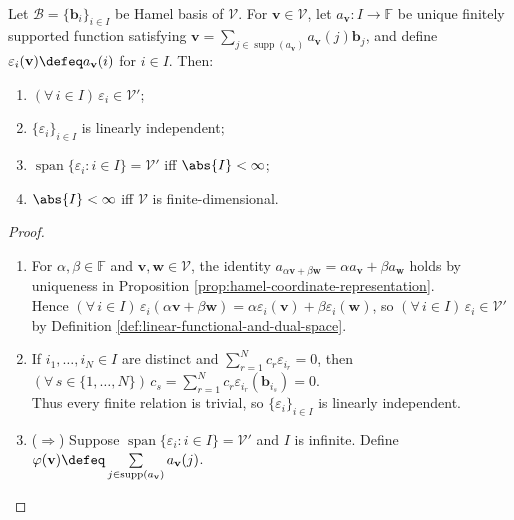 \begin{proposition} \label{prop:coordinate-functionals-for-hamel-basis} \\
Let $\mathcal{B}=\{\mathbf{b}_i\}_{i\in I}$ be Hamel basis of $\mathcal{V}$. For $\mathbf{v}\in\mathcal{V}$, let $a_{\mathbf{v}}:I\to\mathbb{F}$ be unique finitely supported function satisfying $\mathbf{v}=\sum\limits_{j\in\operatorname{supp}(a_{\mathbf{v}})}a_{\mathbf{v}}(j)\mathbf{b}_j$, and define $\varepsilon_i(\mathbf{v})\defeq a_{\mathbf{v}}(i)$ for $i\in I$. Then:
\begin{enumerate}[label=(\roman*)]
\setlength{\itemsep}{0pt}
\item $(\forall\,i\in I)\,\varepsilon_i\in\mathcal{V}'$;
\item $\{\varepsilon_i\}_{i\in I}$ is linearly independent;
\item $\operatorname{span}\{\varepsilon_i:i\in I\}=\mathcal{V}'$ iff $\abs{I}<\infty$;
\item $\abs{I}<\infty$ iff $\mathcal{V}$ is finite-dimensional.
\end{enumerate}
\begin{proof}
\begin{enumerate}[label=(\roman*)]
\setlength{\itemsep}{0pt}
\item[$(i)$] For $\alpha,\beta\in\mathbb{F}$ and $\mathbf{v},\mathbf{w}\in\mathcal{V}$, the identity $a_{\alpha\mathbf{v}+\beta\mathbf{w}}=\alpha a_{\mathbf{v}}+\beta a_{\mathbf{w}}$ holds by uniqueness in Proposition \ref{prop:hamel-coordinate-representation}.\\
Hence $(\forall\,i\in I)\,\varepsilon_i(\alpha\mathbf{v}+\beta\mathbf{w})=\alpha\varepsilon_i(\mathbf{v})+\beta\varepsilon_i(\mathbf{w})$, so $(\forall\,i\in I)\,\varepsilon_i\in\mathcal{V}'$ by Definition \ref{def:linear-functional-and-dual-space}.
\item[$(ii)$] If $i_1,\ldots,i_N\in I$ are distinct and $\sum\limits_{r=1}^{N}c_r\varepsilon_{i_r}=0$, then $(\forall\,s\in\{1,\ldots,N\})\,c_s=\sum\limits_{r=1}^{N}c_r\varepsilon_{i_r}(\mathbf{b}_{i_s})=0$.\\
Thus every finite relation is trivial, so $\{\varepsilon_i\}_{i\in I}$ is linearly independent.
\item[$(iii)$] ($\Rightarrow$) Suppose $\operatorname{span}\{\varepsilon_i:i\in I\}=\mathcal{V}'$ and $I$ is infinite. Define $\varphi(\mathbf{v})\defeq\sum\limits_{j\in\operatorname{supp}(a_{\mathbf{v}})}a_{\mathbf{v}}(j)$.\\

\end{enumerate}
\end{proof}
\end{proposition}
